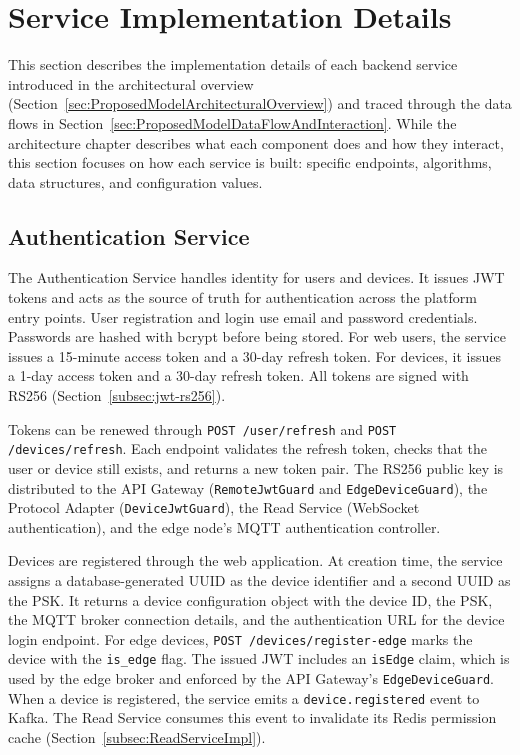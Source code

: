 
\section{Service Implementation Details}
\label{sec:ServiceImplementationDetails}

This section describes the implementation details of each backend service introduced in the architectural overview (Section~\ref{sec:ProposedModelArchitecturalOverview}) and traced through the data flows in Section~\ref{sec:ProposedModelDataFlowAndInteraction}. While the architecture chapter describes what each component does and how they interact, this section focuses on how each service is built: specific endpoints, algorithms, data structures, and configuration values.

\subsection{Authentication Service}
\label{subsec:AuthServiceImpl}

The Authentication Service handles identity for users and devices. It issues \gls{JWT} tokens and acts as the source of truth for authentication across the platform entry points. User registration and login use email and password credentials. Passwords are hashed with bcrypt before being stored. For web users, the service issues a 15-minute access token and a 30-day refresh token. For devices, it issues a 1-day access token and a 30-day refresh token. All tokens are signed with RS256 (Section~\ref{subsec:jwt-rs256}).

Tokens can be renewed through \texttt{POST /user/refresh} and \texttt{POST /devices/refresh}. Each endpoint validates the refresh token, checks that the user or device still exists, and returns a new token pair. The RS256 public key is distributed to the API Gateway (\texttt{RemoteJwtGuard} and \texttt{EdgeDeviceGuard}), the Protocol Adapter (\texttt{DeviceJwtGuard}), the Read Service (WebSocket authentication), and the edge node's \gls{MQTT} authentication controller.

Devices are registered through the web application. At creation time, the service assigns a database-generated \gls{UUID} as the device identifier and a second \gls{UUID} as the \gls{PSK}. It returns a device configuration object with the device \gls{ID}, the \gls{PSK}, the \gls{MQTT} broker connection details, and the authentication \gls{URL} for the device login endpoint. For edge devices, \texttt{POST /devices/register-edge} marks the device with the \texttt{is\_edge} flag. The issued \gls{JWT} includes an \texttt{isEdge} claim, which is used by the edge broker and enforced by the API Gateway's \texttt{EdgeDeviceGuard}. When a device is registered, the service emits a \texttt{device.registered} event to Kafka. The Read Service consumes this event to invalidate its Redis permission cache (Section~\ref{subsec:ReadServiceImpl}).

